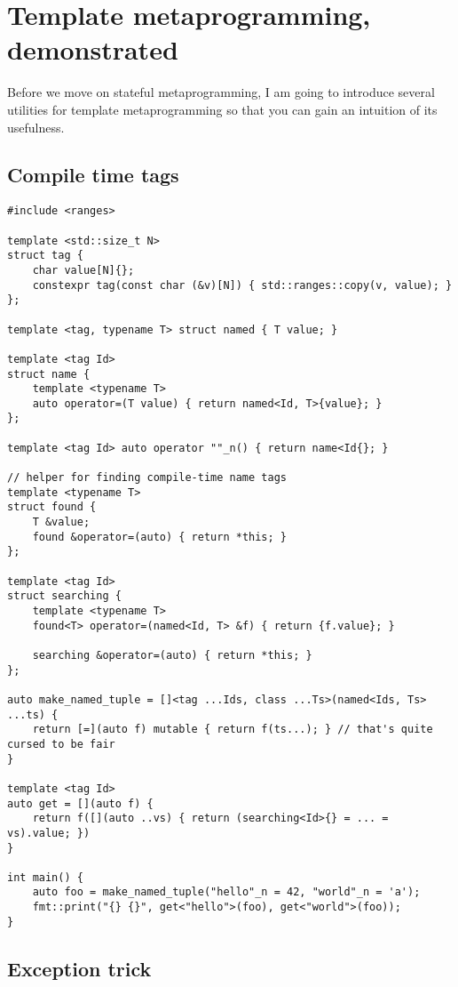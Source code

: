 \hrulefill

\section*{Template metaprogramming, demonstrated}

Before we move on stateful metaprogramming, I am going to introduce several
utilities for template metaprogramming so that you can gain an intuition of its
usefulness.

\subsection*{Compile time tags}
\begin{verbatim}
#include <ranges>

template <std::size_t N>
struct tag {
    char value[N]{};
    constexpr tag(const char (&v)[N]) { std::ranges::copy(v, value); }
};

template <tag, typename T> struct named { T value; }

template <tag Id>
struct name {
    template <typename T>
    auto operator=(T value) { return named<Id, T>{value}; }
};

template <tag Id> auto operator ""_n() { return name<Id{}; }

// helper for finding compile-time name tags
template <typename T>
struct found {
    T &value;
    found &operator=(auto) { return *this; }
};

template <tag Id>
struct searching {
    template <typename T>
    found<T> operator=(named<Id, T> &f) { return {f.value}; }

    searching &operator=(auto) { return *this; }
};

auto make_named_tuple = []<tag ...Ids, class ...Ts>(named<Ids, Ts> ...ts) {
    return [=](auto f) mutable { return f(ts...); } // that's quite cursed to be fair
}

template <tag Id>
auto get = [](auto f) {
    return f([](auto ..vs) { return (searching<Id>{} = ... = vs).value; })
}

int main() {
    auto foo = make_named_tuple("hello"_n = 42, "world"_n = 'a');
    fmt::print("{} {}", get<"hello">(foo), get<"world">(foo));
}
\end{verbatim}

\subsection*{Exception trick}

